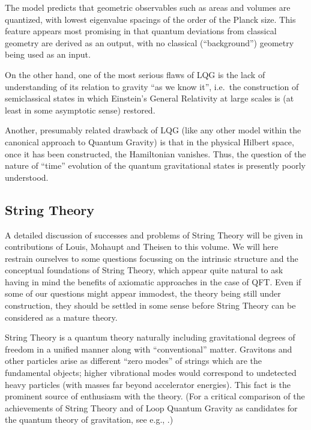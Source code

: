 \documentclass[multphys,vecphys]{svmult}
\begin{document}
The model predicts that geometric observables such as areas and
volumes are quantized, with lowest eigenvalue spacings of the order
of the Planck size. This feature appears most
promising in that quantum deviations from classical geometry are
derived as an output, with no classical
(``background'') geometry being used as an input. 

On the other hand, one of the most serious flaws of LQG is the lack of
understanding of its relation to gravity ``as we know it'', i.e.\ the
construction of semiclassical states in which
Einstein's General Relativity at large scales is (at least in some
asymptotic sense) restored. 

Another, presumably related drawback of LQG (like any other model
within the canonical approach to Quantum Gravity) is that in the
physical Hilbert space, once it has been
constructed, the Hamiltonian vanishes. Thus, the question of the
nature of ``time'' evolution of the quantum gravitational states
is presently poorly understood.  

\subsection{String Theory}

A detailed discussion of successes and problems of String Theory
will be given in contributions of Louis, Mohaupt and Theisen to
this volume. 
We will here restrain ourselves to some questions focussing on the
intrinsic structure and the conceptual foundations of String Theory, 
which appear quite natural to ask having in mind the benefits of
axiomatic approaches in the case of
QFT. Even if some of our questions might appear immodest, the theory
being still under construction,  they should be settled in some sense
before String Theory can be considered as a mature theory. 

String Theory is a quantum theory naturally including
gravitational degrees of freedom in a unified
manner along with ``conventional'' matter. Gravitons and other
particles arise as different ``zero modes'' of strings which are the
fundamental objects; higher vibrational modes would correspond to
undetected heavy particles (with masses far beyond accelerator energies). 
This fact is the prominent source of enthusiasm with the theory. (For
a critical comparison of the achievements of String Theory and of Loop
Quantum Gravity as candidates for the quantum theory of gravitation,
see e.g., \cite{Smo}.) 
\end{document}
